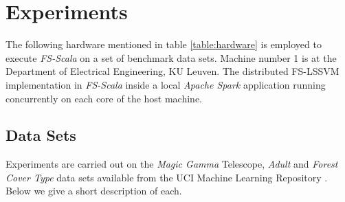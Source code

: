 \chapter{Experiments}
\label{cha:n}
The following hardware mentioned in table \ref{table:hardware} is employed to execute \textit{FS-Scala} on a set of benchmark data sets. Machine number 1 is at the Department of Electrical Engineering, KU Leuven. The distributed FS-LSSVM implementation in \emph{FS-Scala} inside a local \emph{Apache Spark} application running concurrently on each core of the host machine.

\begin{table*}[!htbp]
\caption{Hardware Specifications}
\label{table:hardware}
\end{table*}

\section{Data Sets}

Experiments are carried out on the \textit{Magic Gamma} Telescope, \textit{Adult} and \textit{Forest Cover Type} data sets available from the UCI Machine Learning Repository \cite{Lichman:2013}. Below we give a short description of each.

